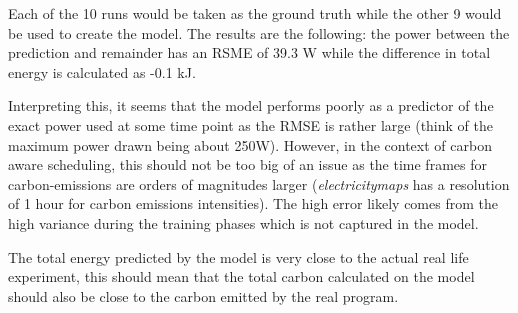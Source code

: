 Each of the 10 runs would be taken as the ground truth while the other 9 would be used to create the model. 
The results are the following: the power between the prediction and remainder has an RSME of 39.3 W while the difference in total energy is calculated as -0.1 kJ. 

Interpreting this, it seems that the model performs poorly as a predictor of the exact power used at some time point as the RMSE is rather large (think of the maximum power drawn being about 250W). 
However, in the context of carbon aware scheduling, this should not be too big of an issue as the time frames for carbon-emissions are orders of magnitudes larger (\emph{electricitymaps} has a resolution of 1 hour for carbon emissions intensities). 
The high error likely comes from the high variance during the training phases which is not captured in the model.

The total energy predicted by the model is very close to the actual real life experiment, this should mean that the total carbon calculated on the model should also be close to the carbon emitted by the real program.
